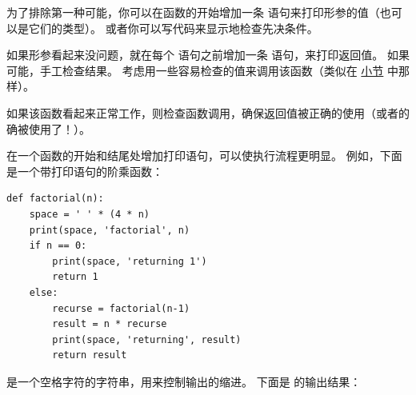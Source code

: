 
为了排除第一种可能，你可以在函数的开始增加一条  语句来打印形参的值（也可以是它们的类型）。
或者你可以写代码来显示地检查先决条件。
  


如果形参看起来没问题，就在每个  语句之前增加一条  语句，来打印返回值。
如果可能，手工检查结果。
考虑用一些容易检查的值来调用该函数（类似在 \hyperref[incremental.development]{小节} 中那样）。



如果该函数看起来正常工作，则检查函数调用，确保返回值被正确的使用（或者的确被使用了！）。


在一个函数的开始和结尾处增加打印语句，可以使执行流程更明显。
例如，下面是一个带打印语句的阶乘函数：

\begin{lstlisting}
def factorial(n):
    space = ' ' * (4 * n)
    print(space, 'factorial', n)
    if n == 0:
        print(space, 'returning 1')
        return 1
    else:
        recurse = factorial(n-1)
        result = n * recurse
        print(space, 'returning', result)
        return result
\end{lstlisting}

%

 是一个空格字符的字符串，用来控制输出的缩进。 下面是  的输出结果：


